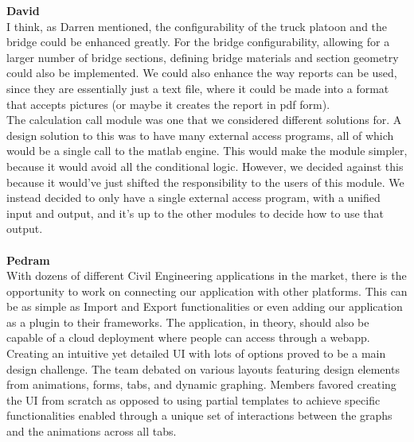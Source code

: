 \documentclass[12pt, titlepage]{article}
\begin{document}
\noindent\textbf{David}\\
I think, as Darren mentioned, the configurability of the truck platoon and the bridge could be enhanced greatly. For 
the bridge configurability, allowing for a larger number of bridge sections, defining bridge materials and section 
geometry could also be implemented. We could also enhance the way reports can be used, since they are essentially just
a text file, where it could be made into a format that accepts pictures (or maybe it creates the report in pdf form).\\

The calculation call module was one that we considered different solutions for. A design solution to this was to have
many external access programs, all of which would be a single call to the matlab engine. This would make the module
simpler, because it would avoid all the conditional logic. However, we decided against this because it would've just
shifted the responsibility to the users of this module. We instead decided to only have a single external access
program, with a unified input and output, and it's up to the other modules to decide how to use that output.\\\\

\noindent\textbf{Pedram}\\
With dozens of different Civil Engineering applications in the market, there is the opportunity to work on connecting our application with other platforms. This can be as simple as Import and Export functionalities or even adding our application as a plugin to their frameworks. The application, in theory, should also be capable of a cloud deployment where people can access through a webapp.\\

Creating an intuitive yet detailed UI with lots of options proved to be a main design challenge. The team debated on various layouts featuring design elements from animations, forms, tabs, and dynamic graphing. Members favored creating the UI from scratch as opposed to using partial templates to achieve specific functionalities enabled through a unique set of interactions between the graphs and the animations across all tabs. 
\end{document}
